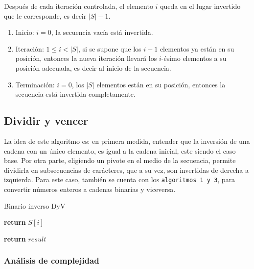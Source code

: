 \documentclass[letter]{article}
\begin{document}
Después de cada iteración controlada, el elemento $i$ queda en el lugar invertido que le corresponde, es decir $|S|-1$.

\begin{enumerate}
    \item Inicio: $i=0$, la secuencia vacía está invertida.
    \item Iteración: $1 \le i<|S|$, si se supone que los $i-1$ elementos ya están en su posición, entonces la nueva iteración llevará los $i$-ésimo elementos a su posición adecuada, es decir al inicio de la secuencia.
    \item Terminación: $i=0$, los $|S|$ elementos están en su posición, entonces la secuencia está invertida completamente.
\end{enumerate}


\subsection{Dividir y vencer} \label{algoritmos:dyv}
La idea de este algoritmo es: en primera medida, entender que la inversión de una cadena con un único elemento, es igual a la cadena inicial, este siendo el caso base. Por otra parte,
eligiendo un pivote en el medio de la secuencia, permite dividirla en subsecuencias de carácteres, que a su vez, son invertidas de derecha a izquierda. Para este caso, también se cuenta con los \texttt{algoritmos 1 y 3}, para convertir números enteros a cadenas binarias y viceversa.


\begin{algorithm}[!htb]
\caption{Binario inverso DyV}
\begin{algorithmic}[1]
      \State \textbf{return} $S[i]$
      \EndIf
   
    \EndFor
    
    \EndFor
  \State \textbf{return} $result$
\EndProcedure
\end{algorithmic}
\end{algorithm}

\subsubsection{Análisis de complejidad} \label{algoritmos:inocente:complejidad}
\end{document}

